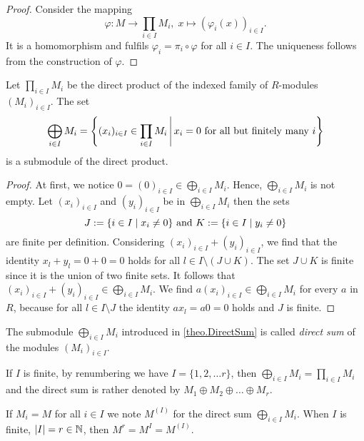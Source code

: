 \begin{proof}
Consider the mapping 
\[\varphi\colon M\to \prod_{i\in I} M_i, \; x \mapsto (\varphi_i(x))_{i\in I}.\]
It is a homomorphism and fulfils $\varphi_i=\pi_i\circ\varphi$ for all $i\in I$. The uniqueness follows from the construction of $\varphi$.
\end{proof}

\begin{thm}\label{theo.DirectSum}
Let $\prod_{i\in I} M_i$ be the direct product of the indexed family of $R$-modules $(M_i)_{i\in I}$. The set
\begin{equation*}
\bigoplus_{i\in I}M_i=\left\lbrace (x_i)_{i\in I}\in \prod_{i\in I} M_i \middle\arrowvert x_i=0 \textnormal{ for all but finitely many } i\right\rbrace
\end{equation*}
is a submodule of the direct product.
\end{thm}

\begin{proof}
At first, we notice $0=(0)_{i\in I}\in \bigoplus_{i\in I}M_i$. Hence, $\bigoplus_{i\in I}M_i$ is not empty. Let $(x_i)_{i\in I}$ and $(y_i)_{i\in I}$ be in $\bigoplus_{i\in I}M_i$ then the sets
\begin{equation*}
J:=\lbrace i\in I\mid x_i\neq 0\rbrace \textnormal{ and } K:=\lbrace i\in I\mid y_i\neq 0\rbrace
\end{equation*} 
are finite per definition. Considering $(x_i)_{i\in I}+(y_i)_{i\in I}$, we find that the identity $x_l+y_l=0+0=0$ holds for all $l\in I\setminus (J\cup K)$. The set $J\cup K$ is finite since it is the union of two finite sets. It follows that $(x_i)_{i\in I}+(y_i)_{i\in I}\in \bigoplus_{i\in I}M_i$. We find $a(x_i)_{i\in I}\in \bigoplus_{i\in I}M_i$ for every $a$ in $R$, because for all $l\in I\setminus J$ the identity $ax_l=a0=0$ holds and $J$ is finite.
\end{proof}

\begin{defin}
\begin{thmlist}
\item\sloppypar The submodule $\bigoplus_{i\in I}M_i$ introduced in \cref{theo.DirectSum} is called \emph{direct sum} of the modules $(M_i)_{i\in I}$.
\item If $I$ is finite, \ie by renumbering we have $I=\lbrace 1,2,\ldots r\rbrace$, then $\bigoplus_{i\in I}M_i=\prod_{i\in I} M_i$ and the direct sum is rather denoted by $M_1\oplus M_2\oplus\ldots\oplus M_r$.
\item If $M_i=M$ for all $i\in I$ we note $M^{(I)}$ for the direct sum $\bigoplus_{i\in I}M_i$. When $I$ is finite, \ie $|I|=r\in\operatorname{\mathbb{N}}$, then $M^r=M^I=M^{(I)}$.
\end{thmlist}
\end{defin}

